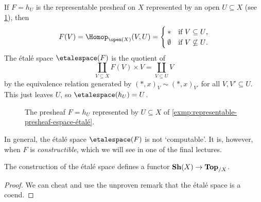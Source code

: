 \begin{exmp}\label{exmp:representable-presheaf-espace-étalé}
If $F = h_U$ is the representable presheaf on $X$ represented by an open $U\subseteq X$ (see \cref{fig:presheaf-represented-by-U}), then
\[ F(V) = \Hom[\open(X)](V,U) = \begin{cases}
    \terminal & \text{if } V\subseteq U\text{,} \\
    \emptyset & \text{if } V\not\subseteq U\text{.}
\end{cases}\]
The étalé space $\etalespace(F)$ is the quotient of
\[ \coprod_{V\subseteq X} F(V)\times V = \coprod_{V\subseteq U} V \]
by the equivalence relation generated by $(*,x)_V\sim(*,x)_{V'}$ for all $V,V'\subseteq U$.
This just leaves $U$, so $\etalespace(h_U) = U$.
\end{exmp}

\begin{figure}
    \centering
    \caption{The presheaf $F = h_U$ represented by $U\subseteq X$ of \cref{exmp:representable-presheaf-espace-étalé}.}
    \label{fig:presheaf-represented-by-U}
\end{figure}

\begin{rmk}
In general, the étalé space $\etalespace(F)$ is not `computable'.
It is, however, when $F$ is \emph{constructible}, which we will see in one of the final lectures.
\end{rmk}

\begin{prop}
    The construction of the étalé space defines a functor
    $\operatorname{\mathbf{Sh}}(X) \to \mathbf{Top}_{/X}$.
\end{prop}
\begin{proof}
    We can cheat and use the unproven remark that the étalé space is a coend. 
\end{proof}